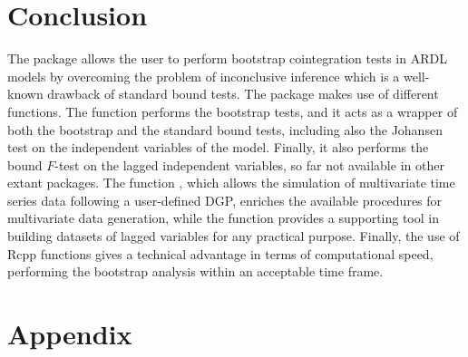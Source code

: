 \section{Conclusion}\label{sec:end}
The  package allows the user to perform bootstrap cointegration tests in ARDL models by overcoming the problem of inconclusive inference which is a well-known drawback of standard bound tests. 
The package makes use of different functions.
The function  performs the bootstrap tests, and it acts as a wrapper of both the bootstrap and the standard bound tests, including also the Johansen test on the independent variables of the model. Finally, it also performs the bound $F$-test on the lagged independent variables, so far not available in other extant  packages.
The function , which allows the simulation of multivariate time series data following a user-defined DGP, enriches the available procedures for multivariate data generation, while the function  provides a supporting tool in building datasets of lagged variables for any practical purpose. Finally, the use of Rcpp functions gives a technical advantage in terms of computational speed, performing the bootstrap analysis within an acceptable time frame.

\newpage
\section{Appendix}\label{sec:appendix}
